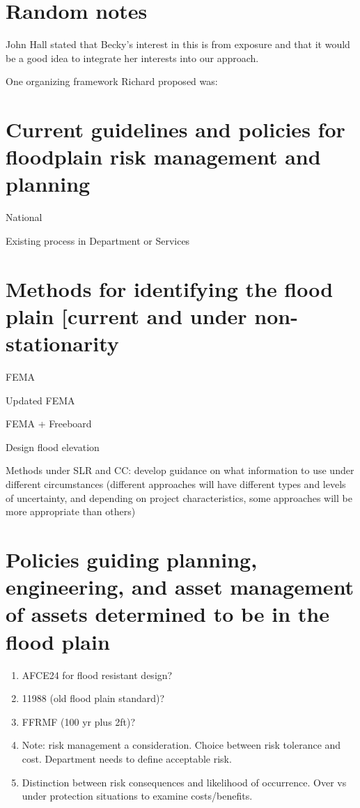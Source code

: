 \documentclass[10pt]{amsart}
\begin{document}
\section{Random notes}
John Hall stated that Becky's interest in this is from exposure and that it would be a good idea to integrate her interests into our approach.

One organizing framework Richard proposed was:
\section{Current guidelines and policies for floodplain risk management and planning}
National

Existing process in Department or Services
\section{Methods for identifying the flood plain [current and under non-stationarity}
FEMA

Updated FEMA

FEMA + Freeboard

Design flood elevation

Methods under SLR and CC: develop guidance on what information to use under different circumstances (different approaches will have different types and levels of uncertainty, and depending on project characteristics, some approaches will be more appropriate than others)

\section{Policies guiding planning, engineering, and asset management of assets determined to be in the flood plain}
\begin{enumerate}
\item AFCE24 for flood resistant design?
\item 11988 (old flood plain standard)?
\item FFRMF (100 yr plus 2ft)?
\item Note: risk management a consideration. Choice between risk tolerance and cost. Department needs to define acceptable risk.
\item Distinction between risk consequences and likelihood of occurrence. Over vs under protection situations to examine costs/benefits.
\end{enumerate}
\end{document}
